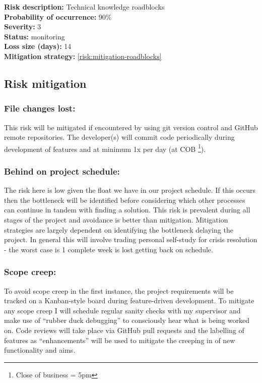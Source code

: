 \hrulefill

\textbf{Risk description:} Technical knowledge roadblocks\\
\vspace{-2mm}
\textbf{Probability of occurrence:} 90\%\\
\vspace{-2mm}
\textbf{Severity:} 3\\
\vspace{-2mm}
\textbf{Status:} monitoring\\
\vspace{-2mm}
\textbf{Loss size (days):} 14\\
\textbf{Mitigation strategy:} \cref{risk:mitigation-roadblocks}\\
\par

\subsection{Risk mitigation}
\subsubsection{File changes lost:}
\label{risk:mitigation-files}
\vspace{-2mm}
This risk will be mitigated if encountered by using git version control and GitHub remote repositories.
The developer(s) will commit code periodically during development of features
and at minimum 1x per day (at COB \footnote{Close of business = 5pm}).

\subsubsection{Behind on project schedule:}
\label{risk:mitigation-timeline}
\vspace{-2mm}
The risk here is low given the float we have in our project schedule.
If this occurs then the bottleneck will be identified before considering
which other processes can continue in tandem with finding a solution. This risk 
is prevalent during all stages of the project and avoidance is better than mitigation.
Mitigation strategies are largely dependent on identifying the bottleneck delaying the project.
In general this will involve trading personal self-study for crisis resolution - the worst case is 1 complete week is lost
getting back on schedule.

\subsubsection{Scope creep:}
\label{risk:mitigation-scope}
\vspace{-2mm}
To avoid scope creep in the first instance, the project requirements will be tracked on a Kanban-style board during
feature-driven development. To mitigate any scope creep I will schedule regular sanity checks with my supervisor and
make use of ``rubber duck debugging'' to consciously hear what is being worked on.
Code reviews will take place via GitHub pull requests and the labelling of features
as ``enhancements'' will be used to mitigate the creeping in of new functionality and aims.


